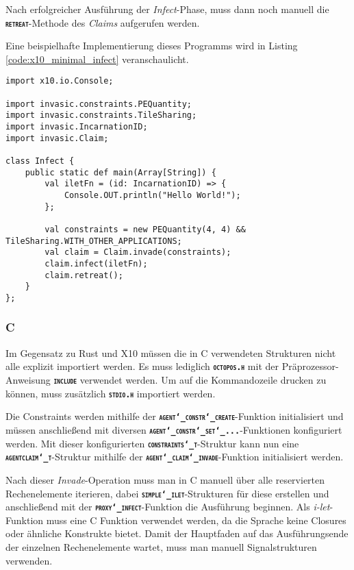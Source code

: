 Nach erfolgreicher Ausführung der \textit{Infect}-Phase, muss dann noch manuell die 
\texttt{\textsc{\textbf{retreat}}}-Methode des \textit{Claims} aufgerufen werden.

Eine beispielhafte Implementierung dieses Programms wird in Listing \ref{code:x10_minimal_infect} veranschaulicht.

\lstset{basicstyle=\tiny}
\begin{lstlisting}[float,caption={Minimales Invade, Infect, Retreat in X10},label=code:x10_minimal_infect]
import x10.io.Console;

import invasic.constraints.PEQuantity;
import invasic.constraints.TileSharing;
import invasic.IncarnationID;
import invasic.Claim;

class Infect {
    public static def main(Array[String]) {
        val iletFn = (id: IncarnationID) => {
            Console.OUT.println("Hello World!");
        };

        val constraints = new PEQuantity(4, 4) && TileSharing.WITH_OTHER_APPLICATIONS;
        val claim = Claim.invade(constraints);
        claim.infect(iletFn);
        claim.retreat();
    }
};
\end{lstlisting}
\lstset{basicstyle=\normalsize}

\subsubsection{C}

Im Gegensatz zu Rust und X10 müssen die in C verwendeten Strukturen nicht alle explizit importiert werden.
Es muss lediglich \texttt{\textsc{\textbf{octopos.h}}} mit der Präprozessor-Anweisung
\texttt{\textsc{\textbf{include}}} verwendet werden.
Um auf die Kommandozeile drucken zu können, muss zusätzlich \texttt{\textsc{\textbf{stdio.h}}} importiert werden.

Die Constraints werden mithilfe der \texttt{\textsc{\textbf{agent\char`_constr\char`_create}}}-Funktion initialisiert
und müssen anschließend mit diversen \texttt{\textsc{\textbf{agent\char`_constr\char`_set\char`_...}}}-Funktionen
konfiguriert werden.
Mit dieser konfigurierten \texttt{\textsc{\textbf{constraints\char`_t}}}-Struktur kann nun eine
\texttt{\textsc{\textbf{agentclaim\char`_t}}}-Struktur mithilfe
der \texttt{\textsc{\textbf{agent\char`_claim\char`_invade}}}-Funktion initialisiert werden.

Nach dieser \textit{Invade}-Operation muss man in C manuell über alle reservierten Rechenelemente iterieren, dabei
\texttt{\textsc{\textbf{simple\char`_ilet}}}-Strukturen für diese erstellen und anschließend mit der
\texttt{\textsc{\textbf{proxy\char`_infect}}}-Funktion
die Ausführung beginnen. Als \textit{i-let}-Funktion muss eine C Funktion verwendet werden,
da die Sprache keine Closures oder ähnliche Konstrukte bietet.
Damit der Hauptfaden auf das Ausführungsende der einzelnen Rechenelemente wartet, muss
man manuell Signalstrukturen verwenden.


